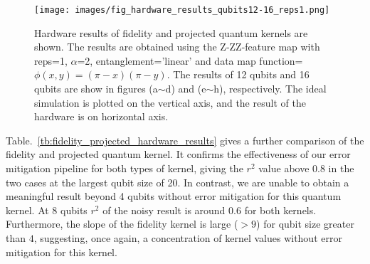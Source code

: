\documentclass[reprint,amsfonts, amssymb, amsmath,  showkeys, nofootinbib,pra, superscriptaddress, twocolumn,longbibliography]{revtex4-2}
\begin{document}
\begin{figure*}
\centering
    \texttt{[image: images/fig\_hardware\_results\_qubits12-16\_reps1.png]}
    \caption{\label{Fig:qke_hardware_result_qubits12-16} 
    Hardware results of fidelity and projected quantum kernels are shown. The results are obtained using the Z-ZZ-feature map with reps=1, $\alpha$=2, entanglement='linear' and data map function=$\phi(x,y)=(\pi-x)(\pi-y)$.
    The results of 12 qubits and 16 qubits are show in figures (a$\sim$d) and (e$\sim$h), respectively. The ideal simulation is plotted on the vertical axis, and the result of the hardware is on horizontal axis.
    }
\end{figure*}

Table.~\ref{tb:fidelity_projected_hardware_results} gives a further comparison of the fidelity and projected quantum kernel. 
It confirms the effectiveness of our error mitigation pipeline for both types of kernel, giving the $r^2$ value above 0.8 in the two cases at the largest qubit size of 20.
In contrast, we are unable to obtain a meaningful result beyond 4 qubits without error mitigation for this quantum kernel. At 8 qubits $r^2$ of the noisy result is around $0.6$ for both kernels. Furthermore, the slope of the fidelity kernel is large ($>9$) for qubit size greater than $4$, suggesting, once again, a concentration of kernel values without error mitigation for this kernel.
\end{document}
